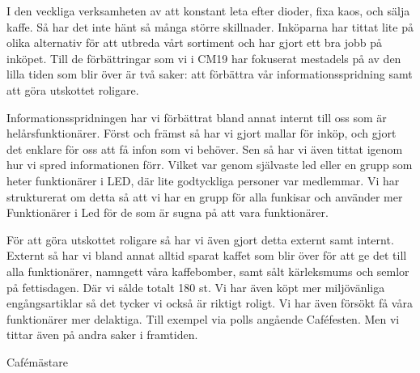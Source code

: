 \documentclass[../_main/handlingar.tex]{subfiles}
\begin{document}

I den veckliga verksamheten av att konstant leta efter dioder, fixa kaos, och sälja kaffe. Så har det inte hänt så många större skillnader. Inköparna har tittat lite på olika alternativ för att utbreda vårt sortiment och har gjort ett bra jobb på inköpet. Till de förbättringar som vi i CM19 har fokuserat mestadels på av den lilla tiden som blir över är två saker: att förbättra vår informationsspridning samt att göra utskottet roligare. 

Informationsspridningen har vi förbättrat bland annat internt till oss som är helårsfunktionärer. Först och främst så har vi gjort mallar för inköp, och gjort det enklare för oss att få infon som vi behöver. Sen så har vi även tittat igenom hur vi spred informationen förr. Vilket var genom självaste led eller en grupp som heter funktionärer i LED, där lite godtyckliga personer var medlemmar. Vi har strukturerat om detta så att vi har en grupp för alla funkisar och använder mer Funktionärer i Led för de som är sugna på att vara funktionärer.

För att göra utskottet roligare så har vi även gjort detta externt samt internt. Externt så har vi bland annat alltid sparat kaffet som blir över för att ge det till alla funktionärer, namngett våra kaffebomber, samt sålt kärleksmums och semlor på fettisdagen. Där vi sålde totalt 180 st. Vi har även köpt mer miljövänliga engångsartiklar så det tycker vi också är riktigt roligt. Vi har även försökt få våra funktionärer mer delaktiga. Till exempel via polls angående Caféfesten. Men vi tittar även på andra saker i framtiden.

\begin{signatures}{1}
    \mvh
    \signature{\cafem}{Cafémästare}
\end{signatures}
\end{document}
